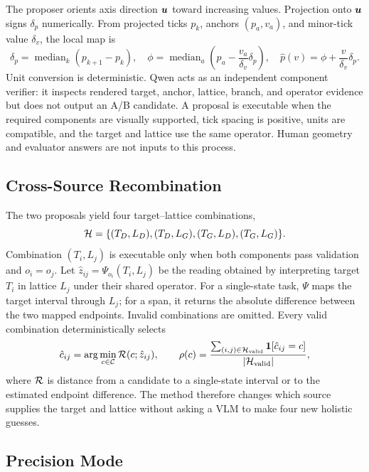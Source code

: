 The proposer orients axis direction $\boldsymbol{u}$ toward increasing values. Projection onto $\boldsymbol{u}$ signs $\delta_p$ numerically. From projected ticks $p_k$, anchors $(p_a,v_a)$, and minor-tick value $\delta_v$, the local map is
\begin{equation}
 \delta_p=\operatorname{median}_k(p_{k+1}-p_k),\quad
 \phi=\operatorname{median}_a\!\left(p_a-\frac{v_a}{\delta_v}\delta_p\right),\quad
 \hat p(v)=\phi+\frac{v}{\delta_v}\delta_p .
 \label{eq:auto-map}
\end{equation}
Unit conversion is deterministic. Qwen acts as an independent component verifier: it inspects rendered target, anchor, lattice, branch, and operator evidence but does not output an A/B candidate. A proposal is executable when the required components are visually supported, tick spacing is positive, units are compatible, and the target and lattice use the same operator. Human geometry and evaluator answers are not inputs to this process.

\subsection{Cross-Source Recombination}

The two proposals yield four target--lattice combinations,
\begin{equation}
 \mathcal{H}=\{(T_D,L_D),(T_D,L_G),(T_G,L_D),(T_G,L_G)\}.
 \label{eq:factorial}
\end{equation}
Combination $(T_i,L_j)$ is executable only when both components pass validation and $o_i=o_j$. Let $\hat z_{ij}=\Psi_{o_i}(T_i,L_j)$ be the reading obtained by interpreting target $T_i$ in lattice $L_j$ under their shared operator. For a single-state task, $\Psi$ maps the target interval through $L_j$; for a span, it returns the absolute difference between the two mapped endpoints. Invalid combinations are omitted. Every valid combination deterministically selects
\begin{equation}
 \hat c_{ij}=\arg\min_{c\in\mathcal{C}}\mathcal{R}(c;\hat z_{ij}),\qquad
 \rho(c)=\frac{\sum_{(i,j)\in\mathcal{H}_{\rm valid}}\mathbf{1}[\hat c_{ij}=c]}
 {|\mathcal{H}_{\rm valid}|},
 \label{eq:choice}
\end{equation}
where $\mathcal{R}$ is distance from a candidate to a single-state interval or to the estimated endpoint difference. The method therefore changes which source supplies the target and lattice without asking a VLM to make four new holistic guesses.



\subsection{Precision Mode}

